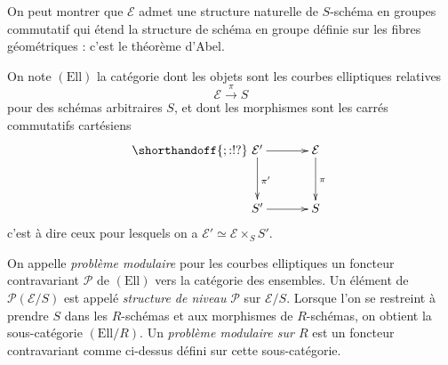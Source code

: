 \documentclass[11pt,a4paper]{article}
\newcommand{\E}{\mathcal{E}}
\renewcommand{\Pr}{\mathcal{P}}
\newcommand{\vers}{\longrightarrow}
\newcommand{\Ell}{\mathrm{Ell}}
\renewcommand{\v}{\vspace{5mm}}
\theoremstyle{definition}
\begin{document}
On peut montrer que $\E$ admet une structure naturelle de $S$-schéma en groupes commutatif qui étend la structure de schéma en groupe définie sur les fibres géométriques : c'est le théorème d'Abel.
\v

On note $(\Ell)$ la catégorie dont les objets sont les courbes elliptiques relatives
$$\E \overset{\pi}{\vers} S$$
pour des schémas arbitraires $S$, et dont les morphismes sont les carrés commutatifs cartésiens
$$
\shorthandoff{;:!?}
\xymatrix @!=8mm {
\E' \ar[d]^{\pi'} \ar[r]  & \E \ar[d]^{\pi} \\
 S' \ar[r] & S
}
$$
c'est à dire ceux pour lesquels on a $\E' \simeq \E \times_S S'$.

On appelle \emph{problème modulaire} pour les courbes elliptiques un foncteur contravariant $\Pr$ de $(\Ell)$ vers la catégorie des ensembles. Un élément de $\Pr(\E/S)$ est appelé \emph{structure de niveau} $\Pr$ sur $\E/S$. Lorsque l'on se restreint à prendre $S$ dans les $R$-schémas et aux morphismes de $R$-schémas, on obtient la sous-catégorie $(\Ell/R)$. Un \emph{problème modulaire sur $R$} est un foncteur contravariant comme ci-dessus défini sur cette sous-catégorie.
\end{document}
